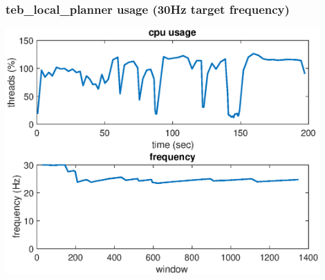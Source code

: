 \documentclass{beamer}
\newcommand{\<}{\langle}
\theoremstyle{example}
\begin{document}
\begin{frame}
  \frametitle{teb\_local\_planner usage (30Hz target frequency)}
  \begin{center}
    \includegraphics[width=0.9\textwidth]{fig/teb.eps}
  \end{center}
\end{frame}
\end{document}
